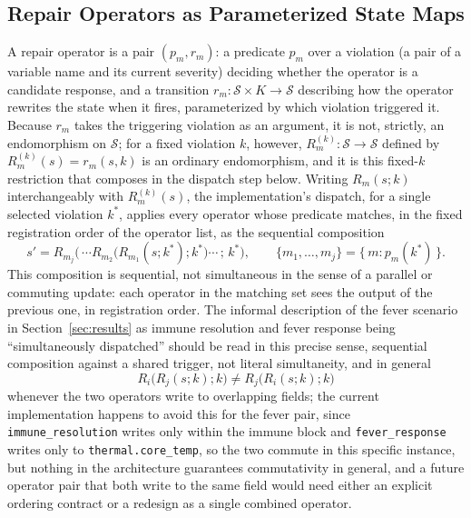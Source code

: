 \documentclass[11pt]{article}
\begin{document}
\subsection{Repair Operators as Parameterized State Maps}

A repair operator is a pair $(p_m, r_m)$: a predicate $p_m$ over a violation (a pair of a variable name and its current severity) deciding whether the operator is a candidate response, and a transition $r_m : \mathcal S \times K \rightarrow \mathcal S$ describing how the operator rewrites the state when it fires, parameterized by which violation triggered it. Because $r_m$ takes the triggering violation as an argument, it is not, strictly, an endomorphism on $\mathcal S$; for a fixed violation $k$, however, $R_m^{(k)} : \mathcal S \rightarrow \mathcal S$ defined by $R_m^{(k)}(s) = r_m(s, k)$ is an ordinary endomorphism, and it is this fixed-$k$ restriction that composes in the dispatch step below. Writing $R_m(s; k)$ interchangeably with $R_m^{(k)}(s)$, the implementation's dispatch, for a single selected violation $k^{*}$, applies every operator whose predicate matches, in the fixed registration order of the operator list, as the sequential composition
\[
s' = R_{m_j} \big(\, \cdots R_{m_2}\big(R_{m_1}(s; k^{*}); k^{*}\big) \cdots \,;\, k^{*}\big), \qquad \{m_1, \ldots, m_j\} = \{\, m : p_m(k^{*}) \,\}.
\]
This composition is sequential, not simultaneous in the sense of a parallel or commuting update: each operator in the matching set sees the output of the previous one, in registration order. The informal description of the fever scenario in Section~\ref{sec:results} as immune resolution and fever response being ``simultaneously dispatched'' should be read in this precise sense, sequential composition against a shared trigger, not literal simultaneity, and in general
\[
R_i\big(R_j(s; k); k\big) \neq R_j\big(R_i(s; k); k\big)
\]
whenever the two operators write to overlapping fields; the current implementation happens to avoid this for the fever pair, since \texttt{immune\_resolution} writes only within the immune block and \texttt{fever\_response} writes only to \texttt{thermal.core\_temp}, so the two commute in this specific instance, but nothing in the architecture guarantees commutativity in general, and a future operator pair that both write to the same field would need either an explicit ordering contract or a redesign as a single combined operator.
\end{document}
